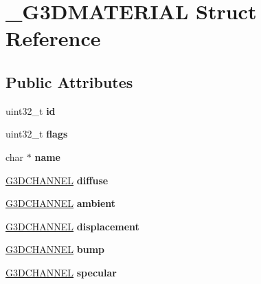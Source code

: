 \hypertarget{struct__G3DMATERIAL}{}\section{\+\_\+\+G3\+D\+M\+A\+T\+E\+R\+I\+AL Struct Reference}
\label{struct__G3DMATERIAL}
\subsection*{Public Attributes}
\begin{DoxyCompactItemize}
\item 
\mbox{\label{struct__G3DMATERIAL_a33dbd430fb149de47ee5d63ad6f17ecf}} 
uint32\+\_\+t {\bfseries id}
\item 
\mbox{\label{struct__G3DMATERIAL_adc1ac23e5a773e4f76d23c76cacb0056}} 
uint32\+\_\+t {\bfseries flags}
\item 
\mbox{\label{struct__G3DMATERIAL_ac98b40efdbfd7c5739648f984ba5be8e}} 
char $\ast$ {\bfseries name}
\item 
\mbox{\label{struct__G3DMATERIAL_a3e3cd88427c82cfd7a57223f6c688b88}} 
\hyperlink{struct__G3DCHANNEL}{G3\+D\+C\+H\+A\+N\+N\+EL} {\bfseries diffuse}
\item 
\mbox{\label{struct__G3DMATERIAL_a029872d7ae7648c0ea305a965c2b99d0}} 
\hyperlink{struct__G3DCHANNEL}{G3\+D\+C\+H\+A\+N\+N\+EL} {\bfseries ambient}
\item 
\mbox{\label{struct__G3DMATERIAL_a787e2afa43ca499c2a1b7d25ab6c30c3}} 
\hyperlink{struct__G3DCHANNEL}{G3\+D\+C\+H\+A\+N\+N\+EL} {\bfseries displacement}
\item 
\mbox{\label{struct__G3DMATERIAL_a6c8dbf43c0f826faf8c543e6d00e992d}} 
\hyperlink{struct__G3DCHANNEL}{G3\+D\+C\+H\+A\+N\+N\+EL} {\bfseries bump}
\item 
\mbox{\label{struct__G3DMATERIAL_afb356029f9c39d20081a7d5a8c0de92f}} 
\hyperlink{struct__G3DCHANNEL}{G3\+D\+C\+H\+A\+N\+N\+EL} {\bfseries specular}
\item 

\end{DoxyCompactItemize}
